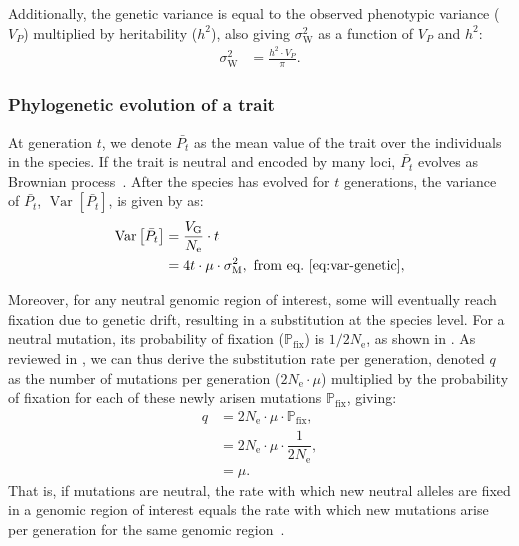 \documentclass{article}
\newcommand{\Multiply}{\cdot}
\DeclareMathOperator{\Var}{\text{Var}}
\newcommand{\Ne}{N_{\text{e}}}
\newcommand{\proba}{\mathbb{P}}
\newcommand{\pfix}{\proba_{\text{fix}}}
\newcommand{\Time}{t}
\newcommand{\Trait}{P}
\newcommand{\Heritability}{h^2}
\newcommand{\MeanTrait}{\bar{\Trait_{\Time}}}
\newcommand{\VarPhy}{\Var \left[\MeanTrait\right]}
\newcommand{\MutationRate}{\mu}
\newcommand{\SubRate}{q}
\newcommand{\VarPhenotype}{V_{\Trait}}
\newcommand{\VarGenetic}{V_{\mathrm{G}}}
\newcommand{\RateMut}{\sigma^2_{\mathrm{M}}}
\newcommand{\RateWhithin}{\sigma^2_{\mathrm{W}}}
\begin{document}
Additionally, the genetic variance is equal to the observed phenotypic variance ($\VarPhenotype$) multiplied by heritability ($\Heritability$), also giving $\RateWhithin$ as a function of $\VarPhenotype$ and $\Heritability$:
\begin{align}
    \RateWhithin & = \frac{\Heritability \Multiply \VarPhenotype }{\pi }. \label{eq:rate-pheno-pop}
\end{align}

\subsubsection*{Phylogenetic evolution of a trait}

At generation $\Time$, we denote $\MeanTrait$ as the mean value of the trait over the individuals in the species.
If the trait is neutral and encoded by many loci, $\MeanTrait$ evolves as Brownian process~\cite{hansen_translating_1996}.
After the species has evolved for $\Time$ generations, the variance of $\MeanTrait$, $\VarPhy$, is given by \textcite{hansen_translating_1996} as:
\begin{align}
    \VarPhy & = \frac{\VarGenetic}{\Ne} \Multiply \Time \\
    & = 4 \Time \Multiply \MutationRate \Multiply \RateMut \label{eq:covar},\text{ from eq.~\ref{eq:var-genetic}},
\end{align}

Moreover, for any neutral genomic region of interest, some will eventually reach fixation due to genetic drift, resulting in a substitution at the species level.
For a neutral mutation, its probability of fixation ($\pfix$) is $1/2\Ne$, as shown in \textcite{kimura_probability_1962}.
As reviewed in \textcite{mccandlish_modeling_2014}, we can thus derive the substitution rate per generation, denoted $\SubRate$ as the number of mutations per generation ($2\Ne \Multiply \MutationRate$) multiplied by the probability of fixation for each of these newly arisen mutations $\pfix$, giving:
\begin{align}
    \SubRate & = 2 \Ne \Multiply \MutationRate \Multiply \pfix, \\
    & = 2 \Ne  \Multiply \MutationRate  \Multiply \dfrac{1}{2\Ne}, \\
    & = \MutationRate. \label{eq:substitution-rate}
\end{align}
That is, if mutations are neutral, the rate with which new neutral alleles are fixed in a genomic region of interest equals the rate with which new mutations arise per generation for the same genomic region~\cite{kimura_evolutionary_1968}.
\end{document}
